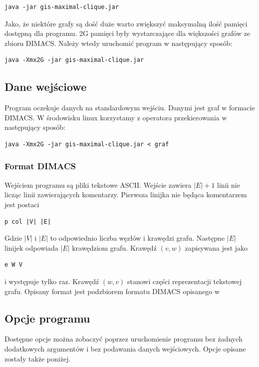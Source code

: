 \documentclass[12pt, a4paper]{article}
\begin{document}
\begin{verbatim}
java -jar gis-maximal-clique.jar
\end{verbatim}

Jako, że niektóre grafy są dość duże warto zwiększyć maksymalną ilość pamięci dostępną dla programu. 2G pamięci były wystarczające dla większości grafów ze zbioru DIMACS. Należy wtedy uruchomić program w następujący sposób:

\begin{verbatim}
java -Xmx2G -jar gis-maximal-clique.jar
\end{verbatim}

\subsection{Dane wejściowe}
Program oczekuje danych na standardowym wejściu. Danymi jest graf w formacie DIMACS. W środowisku linux korzystamy z operatora przekierowania w następujący sposób:

\begin{verbatim}
java -Xmx2G -jar gis-maximal-clique.jar < graf
\end{verbatim}

\subsubsection{Format DIMACS}

Wejściem programu są pliki tekstowe ASCII. Wejście zawiera $|E|+1$ linii nie licząc linii zawierających komentarzy. Pierwsza linijka nie będąca komentarzem jest postaci 
\begin{verbatim}
p col |V| |E|
\end{verbatim}
Gdzie $|V|$ i $|E|$ to odpowiednio liczba węzłów i krawędzi grafu. Następne $|E|$ linijek odpowiada $|E|$ krawędziom grafu. Krawędź $(v, w)$ zapisywana jest jako 
\begin{verbatim}
e W V
\end{verbatim}
i występuje tylko raz. Krawędź $(w, v)$ stanowi części reprezentacji tekstowej grafu. Opisany format jest podzbiorem formatu DIMACS opisanego w \cite{dimacs_format}

\subsection{Opcje programu}
Dostępne opcje można zobaczyć poprzez uruchomienie programu bez żadnych dodatkowych argumentów i bez podawania danych wejściowych. Opcje opisane zostały także poniżej.
\end{document}
